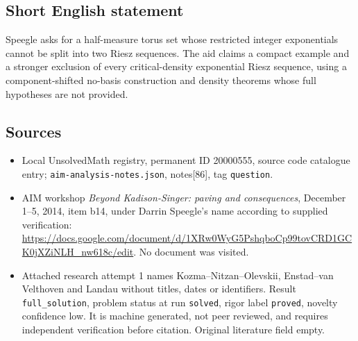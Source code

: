 \documentclass[11pt]{article}
\begin{document}
\subsection{Short English statement}
Speegle asks for a half-measure torus set whose restricted integer exponentials cannot be split into two Riesz sequences. The aid claims a compact example and a stronger exclusion of every critical-density exponential Riesz sequence, using a component-shifted no-basis construction and density theorems whose full hypotheses are not provided.
\subsection{Sources}
\begin{itemize}
\item Local UnsolvedMath registry, permanent ID 20000555, source code catalogue entry; \texttt{aim-analysis-notes.json}, notes[86], tag \texttt{question}.
\item AIM workshop \emph{Beyond Kadison-Singer: paving and consequences}, December 1--5, 2014, item b14, under Darrin Speegle's name according to supplied verification: \url{https://docs.google.com/document/d/1XRw0WyG5PshqboCp99tovCRD1GCK0jXZiNLH_nw618c/edit}. No document was visited.
\item Attached research attempt 1 names Kozma--Nitzan--Olevskii, Enstad--van Velthoven and Landau without titles, dates or identifiers. Result \texttt{full\_solution}, problem status at run \texttt{solved}, rigor label \texttt{proved}, novelty confidence low. It is machine generated, not peer reviewed, and requires independent verification before citation. Original literature field empty.
\end{itemize}
\end{document}
